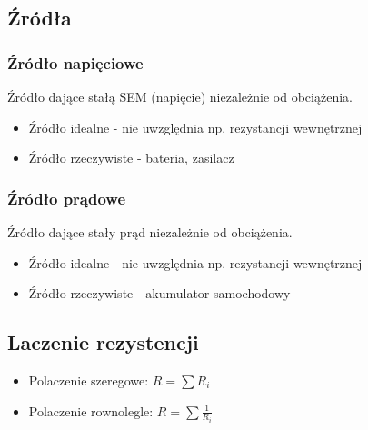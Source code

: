 \documentclass{article}
\begin{document}
\subsection{Źródła}
\subsubsection{Źródło napięciowe}
Źródło dające stałą SEM (napięcie) niezależnie od obciążenia.
\begin{itemize}
    \item Źródło idealne - nie uwzględnia np. rezystancji wewnętrznej
    \item Źródło rzeczywiste - bateria, zasilacz
\end{itemize}

\subsubsection{Źródło prądowe}
Źródło dające stały prąd niezależnie od obciążenia.
\begin{itemize}
    \item Źródło idealne - nie uwzględnia np. rezystancji wewnętrznej
    \item Źródło rzeczywiste - akumulator samochodowy
\end{itemize}

\subsection{Laczenie rezystencji}
\begin{itemize}
    \item Polaczenie szeregowe: $R=\sum R_i$
    \item Polaczenie rownolegle: $R=\sum \frac{1}{R_i}$
\end{itemize}
\end{document}
